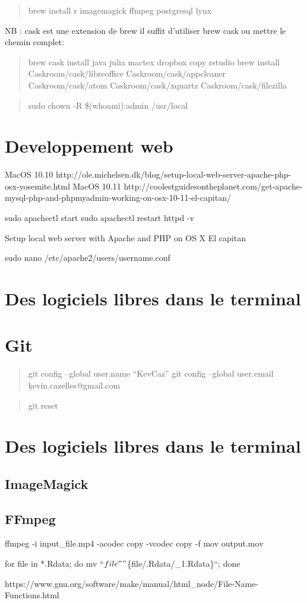 \begin{quote}
brew install r imagemagick ffmpeg postgresql lynx
\end{quote}

NB : cask est une extension de brew il suffit d'utiliser brew cask ou
mettre le chemin complet:

\begin{quote}
brew cask install java julia mactex dropbox copy rstudio brew install
Caskroom/cask/libreoffice Caskroom/cask/appcleaner Caskroom/cask/atom
Caskroom/cask/xquartz Caskroom/cask/filezilla
\end{quote}

\begin{quote}
sudo chown -R \$(whoami):admin /usr/local
\end{quote}

\chapter{Developpement web}\label{developpement-web}

MacOS 10.10
http://ole.michelsen.dk/blog/setup-local-web-server-apache-php-osx-yosemite.html
MacOS 10.11
http://coolestguidesontheplanet.com/get-apache-mysql-php-and-phpmyadmin-working-on-osx-10-11-el-capitan/

sudo apachectl start sudo apachectl restart httpd -v

Setup local web server with Apache and PHP on OS X El capitan

sudo nano /etc/apache2/users/username.conf

\chapter{Des logiciels libres dans le
terminal}\label{des-logiciels-libres-dans-le-terminal}

\chapter{Git}\label{git}

\begin{quote}
git config --global user.name ``KevCaz'' git config --global user.email
kevin.cazelles@gmail.com
\end{quote}

\begin{quote}
git reset
\end{quote}

\chapter{Des logiciels libres dans le
terminal}\label{des-logiciels-libres-dans-le-terminal-1}

\section{ImageMagick}\label{imagemagick}

\section{FFmpeg}\label{ffmpeg}

ffmpeg -i input\_file.mp4 -acodec copy -vcodec copy -f mov output.mov

for file in *.Rdata; do mv ``\(file" "\)\{file/.Rdata/\_1.Rdata\}``;
done

https://www.gnu.org/software/make/manual/html\_node/File-Name-Functions.html
